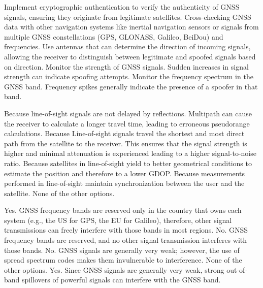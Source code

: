 \begin{questions}
    \begin{checkboxes}
        \choice Implement cryptographic authentication to verify the authenticity of GNSS signals, ensuring they originate from legitimate satellites.
        \choice Cross-checking GNSS data with other navigation systems like inertial navigation sensors or signals from multiple GNSS constellations (GPS, GLONASS, Galileo, BeiDou) and frequencies.
        \choice Use antennas that can determine the direction of incoming signals, allowing the receiver to distinguish between legitimate and spoofed signals based on direction.
        \choice Monitor the strength of GNSS signals. Sudden increases in signal strength can indicate spoofing attempts.
        \CorrectChoice Monitor the frequency spectrum in the GNSS band. Frequency spikes generally indicate the presence of a spoofer in that band.
    \end{checkboxes}


    \begin{checkboxes}
        \CorrectChoice Because line-of-sight signals are not delayed by reflections. Multipath can cause the receiver to calculate a longer travel time, leading to erroneous pseudorange calculations.
        \CorrectChoice Because Line-of-sight signals travel the shortest and most direct path from the satellite to the receiver. This ensures that the signal strength is higher and minimal attenuation is experienced leading to a higher signal-to-noise ratio.
        \choice Because satellites in line-of-sight yield to better geometrical conditions to estimate the position and therefore to a lower GDOP.
        \choice Because measurements performed in line-of-sight maintain synchronization between the user and the satellite.
        \choice None of the other options.
    \end{checkboxes}



    \begin{checkboxes}
        \choice Yes. GNSS frequency bands are reserved only in the country that owns each system (e.g., the US for GPS, the EU for Galileo), therefore, other signal transmissions can freely interfere with those bands in most regions.
        \choice No. GNSS frequency bands are reserved, and no other signal transmission interferes with those bands.
        \choice No. GNSS signals are generally very weak; however, the use of spread spectrum codes makes them invulnerable to interference.
        \choice None of the other options.
        \CorrectChoice Yes. Since GNSS signals are generally very weak, strong out-of-band spillovers of powerful signals can interfere with the GNSS band.
    \end{checkboxes}


\end{questions}
